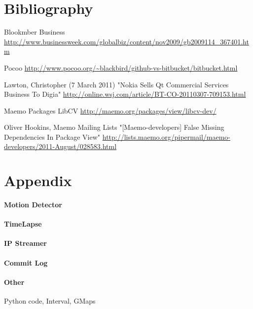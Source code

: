 \documentclass[11pt]{article} %
\begin{document}
\part{Bibliography}
\begin{thebibliography}{9}

 Blookmber Business
\url{http://www.businessweek.com/globalbiz/content/nov2009/gb2009114_367401.htm}

 Pocoo
\url{http://www.pocoo.org/~blackbird/github-vs-bitbucket/bitbucket.html}

 Lawton, Christopher (7 March 2011)
"Nokia Sells Qt Commercial Services Business To Digia"
\url{http://online.wsj.com/article/BT-CO-20110307-709153.html}

 Maemo Packages
LibCV
\url{http://maemo.org/packages/view/libcv-dev/}

 Oliver Hookins, Maemo Mailing Lists
"[Maemo-developers] False Missing Dependencies In Package View"
\url{http://lists.maemo.org/pipermail/maemo-developers/2011-August/028583.html}


\end{thebibliography}

\part{Appendix}
\subsection{Motion Detector}
\subsection{TimeLapse}
\subsection{IP Streamer}
\subsection{Commit Log}
\subsection{Other}{Python code, Interval, GMaps}
\end{document}
